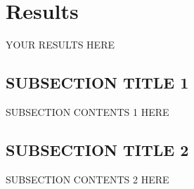 
\section{Results}

YOUR RESULTS HERE

\subsection{SUBSECTION TITLE 1}
SUBSECTION CONTENTS 1 HERE

\subsection{SUBSECTION TITLE 2}
SUBSECTION CONTENTS 2 HERE

\label{sec:discussion}

